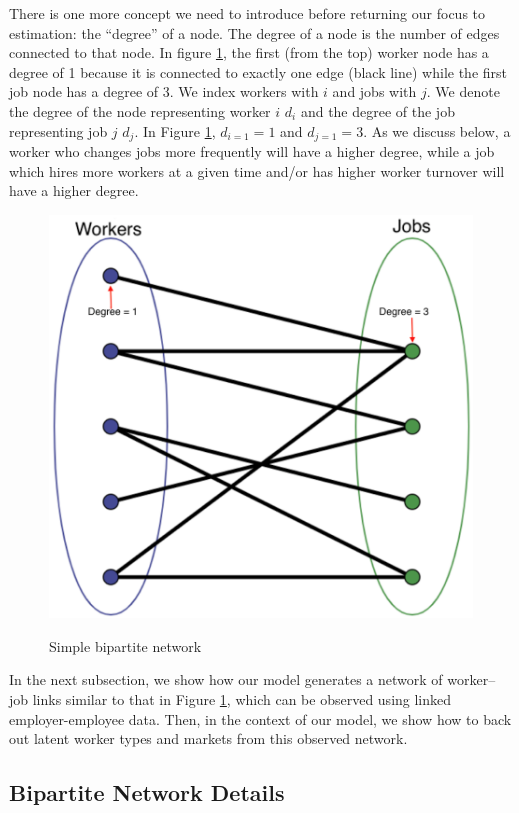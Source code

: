 \documentclass[12pt]{article}
\theoremstyle{definition}
\theoremstyle{plain}
\begin{document}
There is one more concept we need to introduce before returning our focus to estimation: the ``degree'' of a node. The degree of a node is the number of edges connected to that node. In figure  \ref{fig:simple_bipartite_network}, the first (from the top) worker node has a degree of 1 because it is connected to exactly one edge (black line) while the first job node has a degree of 3. We index workers with $i$ and jobs with $j$. We denote the degree of the node representing worker $i$ $d_i$ and the degree of the job representing job $j$ $d_j$. In Figure \ref{fig:simple_bipartite_network}, $d_{i=1}=1$ and $d_{j=1}=3$. As we discuss below, a worker who changes jobs more frequently will have a higher degree, while a job which hires more  workers at a given time and/or has higher worker turnover will have a higher degree. 

\begin{figure}[!htbp]
	\caption{Simple bipartite network}
	\centering
	\includegraphics[width=.69\textwidth]{simple_bipartite_network.png}
	\label{fig:simple_bipartite_network}
\end{figure}

In the next subsection, we show how our model generates a network of worker--job links similar to that in Figure \ref{fig:simple_bipartite_network}, which can be observed using linked employer-employee data.  Then, in the context of our model, we show how to back out latent worker types and markets from this observed network. 



\subsection{Bipartite Network Details}
\end{document}
